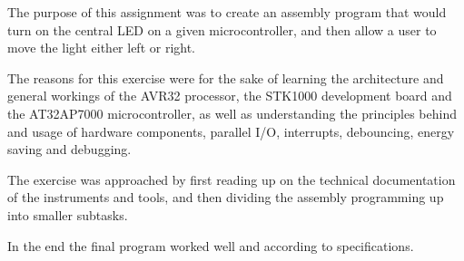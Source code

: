 The purpose of this assignment was to create an assembly program that would turn on the central LED on a given microcontroller, and then allow a user to move the light either left or right.

The reasons for this exercise were for the sake of learning the architecture and general workings of the AVR32 processor, the STK1000 development board and the AT32AP7000 microcontroller, as well as understanding the principles behind and usage of hardware components, parallel I/O, interrupts, debouncing, energy saving and debugging.

The exercise was approached by first reading up on the technical documentation of the instruments and tools, and then dividing the assembly programming up into smaller subtasks.

In the end the final program worked well and according to specifications.

